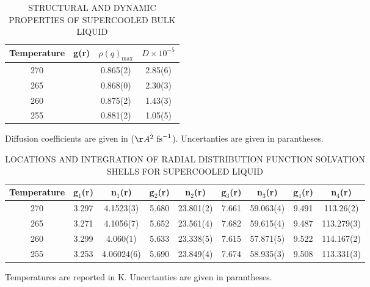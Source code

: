 \begin{table}[h] \centering \caption{STRUCTURAL AND DYNAMIC PROPERTIES
    OF SUPERCOOLED BULK LIQUID\label{tab:qll-liquid}}
\begin{tabular}{cccc}
\hline
\hline
 Temperature & g(r) & $\rho (q)_{\mathrm{max}}$& $D\times 10^{-5}$\\
\hline
270 & &0.865(2) & 2.85(6)\\
265 & &0.868(0) & 2.30(3)\\
260 & &0.875(2) & 1.43(3)\\
255 & &0.881(2) & 1.05(5) \\
\hline
\hline
\end{tabular}
\begin{flushleft}
Diffusion coefficients are given in ($\AA^2~\mathrm{fs}^{-1}$). Uncertanties are given in parantheses.
\end{flushleft}
\end{table}


\begin{table}[h] \centering \caption{LOCATIONS AND INTEGRATION OF
    RADIAL DISTRIBUTION FUNCTION SOLVATION SHELLS FOR SUPERCOOLED LIQUID\label{tab:gofr}}
\begin{tabular}{ccccccccc}
\hline
\hline
 Temperature & g$_1$(r) & n$_1$(r) & g$_2$(r) & n$_2$(r) & g$_3$(r) &
                                                                      n$_3$(r)
  & g$_4$(r) & n$_4$(r)\\
\hline
270 & 3.297 &4.1523(3) & 5.680 & 23.801(2) & 7.661 & 59.063(4) & 9.491
  & 113.26(2) \\
265 & 3.271 & 4.1056(7) & 5.652 & 23.561(4) & 7.682 & 59.615(4) &
                                                                  9.487
             & 113.279(3) \\
260 & 3.299 & 4.060(1) & 5.633 & 23.338(5) & 7.615 & 57.871(5) & 9.522
  & 114.167(2) \\
255 & 3.253 & 4.06024(6) & 5.690 & 23.849(4) & 7.674 & 58.935(3) &
                                                                   9.508
             & 113.331(3)  \\
\hline
\hline
\end{tabular}
\begin{flushleft}
Temperatures are reported in K. Uncertanties are given in parantheses.
\end{flushleft}
\end{table}


